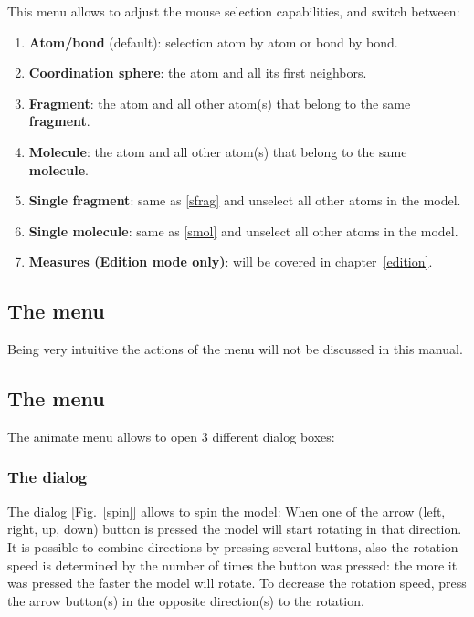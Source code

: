 This menu allows to adjust the mouse selection capabilities, and switch between:
\begin{enumerate}
\item {\bf{Atom/bond}} (default): selection atom by atom or bond by bond.
\item {\bf{Coordination sphere}}: the atom and all its first neighbors.
\item\label{sfrag} {\bf{Fragment}}: the atom and all other atom(s) that belong to the same {\bf{fragment}}.
\item\label{smol} {\bf{Molecule}}: the atom and all other atom(s) that belong to the same {\bf{molecule}}. 
\item {\bf{Single fragment}}: same as \ref{sfrag} and unselect all other atoms in the model.
\item {\bf{Single molecule}}: same as \ref{smol} and unselect all other atoms in the model.
\item {\bf{Measures (Edition mode only)}}: will be covered in chapter~\ref{edition}. 
\end{enumerate}

\clearpage

\subsection{The  menu}

\mviewfig
Being very intuitive the actions of the  menu will not be discussed in this manual. 

\clearpage

\subsection{The  menu}


The animate menu allows to open 3 different dialog boxes:

\subsubsection*{The  dialog} 
\label{sdw}

The  dialog [Fig.~\ref{spin}] allows to spin the model: 
\laf When one of the arrow (left, right, up, down) button is pressed the model will start rotating in that direction. 
It is possible to combine directions by pressing several buttons, also the rotation speed is determined by the number
of times the button was pressed: the more it was pressed the faster the model will rotate. 
To decrease the rotation speed, press the arrow button(s) in the opposite direction(s) to the rotation. 

